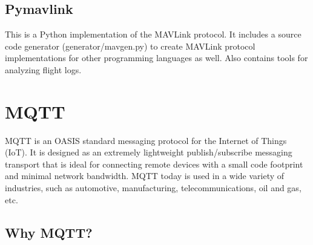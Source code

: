 \documentclass[\main/main.tex]{subfiles}
\begin{document}
\subsection*{Pymavlink}

This is a Python implementation of the MAVLink protocol. It includes a source code generator (generator/mavgen.py) to create MAVLink protocol implementations for other programming languages as well. Also contains tools for analyzing flight logs.




\section{MQTT}
MQTT is an OASIS standard messaging protocol for the Internet of Things (IoT). It is designed as an extremely lightweight publish/subscribe messaging transport that is ideal for connecting remote devices with a small code footprint and minimal network bandwidth. MQTT today is used in a wide variety of industries, such as automotive, manufacturing, telecommunications, oil and gas, etc. \cite{web_mqtt_org}

\subsection*{Why MQTT?}
\end{document}
